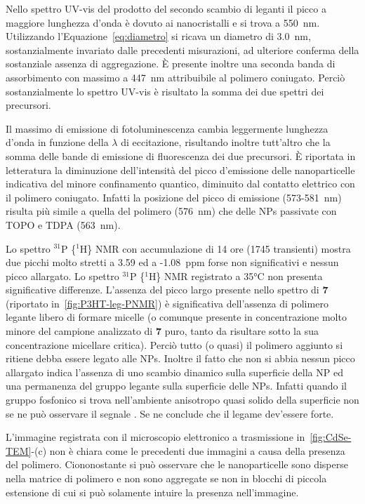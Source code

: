 Nello spettro UV-vis del prodotto del secondo scambio di leganti il picco a maggiore lunghezza d'onda è dovuto ai nanocristalli e si trova a 550~nm. Utilizzando l'Equazione~\ref{eq:diametro} si ricava un diametro di 3.0~nm, sostanzialmente invariato dalle precedenti misurazioni, ad ulteriore conferma della sostanziale assenza di aggregazione. È presente inoltre una seconda banda di assorbimento con massimo a 447~nm attribuibile al polimero coniugato. Perciò sostanzialmente lo spettro UV-vis è risultato la somma dei due spettri dei precursori.

Il massimo di emissione di fotoluminescenza cambia {
 leggermente } lunghezza d'onda in funzione della $\lambda$ di eccitazione, risultando inoltre tutt'altro che la somma delle bande di emissione di fluorescenza dei due precursori. È riportata in letteratura \cite{lig-PL-quenching} la diminuzione dell'intensità del picco d'emissione delle nanoparticelle indicativa del minore confinamento quantico, diminuito dal contatto elettrico con il polimero coniugato. {
 Infatti la posizione del picco di emissione (573-581~nm) risulta più simile a quella del polimero (576~nm) che delle NPs passivate con TOPO e TDPA (563~nm)}.

{
Lo spettro $^{31}$P \{$^1$H\} NMR con accumulazione di 14 ore (1745 transienti) mostra due picchi molto stretti a 3.59 ed a -1.08~ppm forse non significativi e nessun picco allargato. Lo spettro $^{31}$P \{$^1$H\} NMR registrato a 35°C non presenta significative differenze. L'assenza del picco largo presente nello spettro di {\bf 7} (riportato in~\ref{fig:P3HT-leg-PNMR}) è significativa dell'assenza di polimero legante libero di formare micelle (o comunque presente in concentrazione molto minore del campione analizzato di {\bf 7} puro, tanto da risultare sotto la sua concentrazione micellare critica). Perciò tutto (o quasi) il polimero aggiunto si ritiene debba essere legato alle NPs. Inoltre il fatto che non si abbia nessun picco allargato indica l'assenza di uno scambio dinamico sulla superficie della NP ed una permanenza del gruppo legante sulla superficie delle NPs. Infatti quando il gruppo fosfonico si trova nell'ambiente anisotropo quasi solido della superficie non se ne può osservare il segnale \cite{lig-micelle-nmr2}. Se ne conclude che il legame dev'essere forte.}

{
L'immagine registrata con il microscopio elettronico a trasmissione in~\ref{fig:CdSe-TEM}-(c) non è chiara come le precedenti due immagini a causa della presenza del polimero. Ciononostante si può osservare che le nanoparticelle sono disperse nella matrice di polimero e non sono aggregate se non in blocchi di piccola estensione di cui si può solamente intuire la presenza nell'immagine.}

